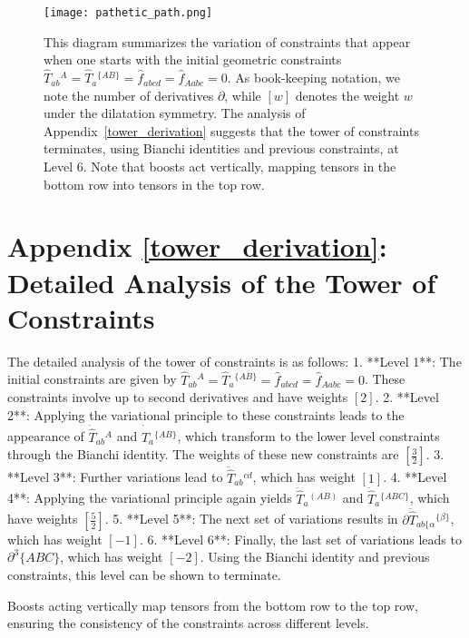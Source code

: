 \documentclass{article}
\begin{document}
\begin{figure}[h]
    \centering
    \texttt{[image: pathetic\_path.png]} %
    \caption{This diagram summarizes the variation of constraints that appear when one starts with the initial geometric constraints $\hat{T}_{ab}{}^{A} = \hat{T}_a{}^{\{AB\}} = \hat{f}_{abcd} = \hat{f}_{Aabc} = 0$. As book-keeping notation, we note the number of derivatives $\partial$, while $[w]$ denotes the weight $w$ under the dilatation symmetry. The analysis of Appendix~\ref{tower_derivation} suggests that the tower of constraints terminates, using Bianchi identities and previous constraints, at Level 6. Note that boosts act vertically, mapping tensors in the bottom row into tensors in the top row.}
    \label{fig:tower_of_constraints}
\end{figure}

\section*{Appendix \ref{tower_derivation}: Detailed Analysis of the Tower of Constraints}
The detailed analysis of the tower of constraints is as follows:
1. **Level 1**: The initial constraints are given by $\hat{T}_{ab}{}^{A} = \hat{T}_a{}^{\{AB\}} = \hat{f}_{abcd} = \hat{f}_{Aabc} = 0$. These constraints involve up to second derivatives and have weights $[2]$.
2. **Level 2**: Applying the variational principle to these constraints leads to the appearance of $\dot{\hat{T}}_{ab}{}^{A}$ and $\dot{\hat{T}}_a{}^{\{AB\}}$, which transform to the lower level constraints through the Bianchi identity. The weights of these new constraints are $[\frac{3}{2}]$.
3. **Level 3**: Further variations lead to $\ddot{\hat{T}}_{ab}{}^{cd}$, which has weight $[1]$.
4. **Level 4**: Applying the variational principle again yields $\ddot{\hat{T}}_{a}{}^{(AB)}$ and $\ddot{\hat{T}}_a{}^{\{ABC\}}$, which have weights $[\frac{5}{2}]$.
5. **Level 5**: The next set of variations results in $\partial\ddot{\hat{T}}_{ab\{\alpha}{}^{\{\beta\}}$, which has weight $[-1]$.
6. **Level 6**: Finally, the last set of variations leads to $\partial^3 \{ABC\}$, which has weight $[-2]$. Using the Bianchi identity and previous constraints, this level can be shown to terminate.

Boosts acting vertically map tensors from the bottom row to the top row, ensuring the consistency of the constraints across different levels.
\end{document}

